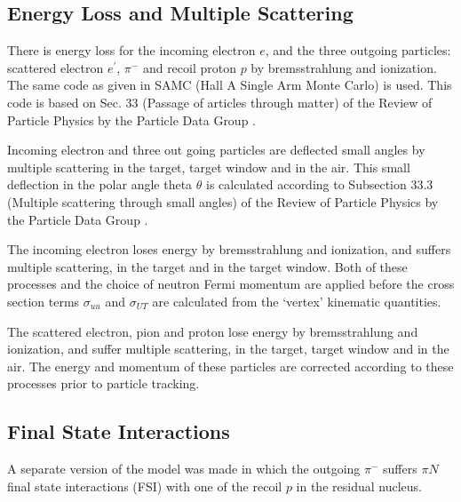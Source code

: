\subsection{Energy Loss and Multiple Scattering
\label{sec:energyloss}}

There is energy loss for the incoming electron $e$, and the three outgoing
particles: scattered electron $e^{\prime}$, $\pi^{-}$ and recoil proton $p$ by
bremsstrahlung and ionization.  The same code as given in SAMC (Hall A Single
Arm Monte Carlo) \cite{samc} is used.  This code is based on Sec. 33 (Passage
of articles through matter) of the Review of Particle Physics by the Particle
Data Group \cite{pdg}.

Incoming electron and three out going particles are deflected small angles by
multiple scattering in the target, target window and in the air. This small
deflection in the polar angle theta $\theta$ is calculated according to
Subsection 33.3 (Multiple scattering through small angles) of the Review of Particle
Physics by the Particle Data Group \cite{pdg}.

The incoming electron loses energy by bremsstrahlung and ionization, and
suffers multiple scattering, in the target and in the target window.  Both of
these processes and the choice of neutron Fermi momentum are applied before the
cross section terms $\sigma_{uu}$ and $\sigma_{UT}$ are calculated from the
`vertex' kinematic quantities.

The scattered electron, pion and proton lose energy by bremsstrahlung and
ionization, and suffer multiple scattering, in the target, target window and in
the air.  The energy and momentum of these particles are corrected according to
these processes prior to particle tracking.

\subsection{Final State Interactions
\label{sec:fsi}}

A separate version of the model was made in which the outgoing $\pi^-$ suffers
$\pi N$ final state interactions (FSI) with one of the recoil $p$ in the
residual nucleus.


